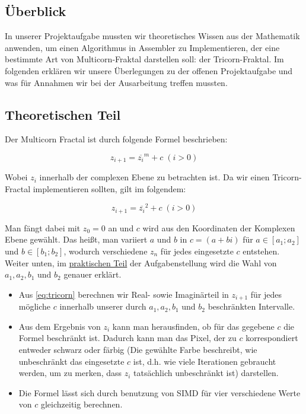 \documentclass[course=erap]{aspdoc}
\begin{document}
\subsection{\"Uberblick}
In unserer Projektaufgabe mussten wir theoretisches Wissen aus der Mathematik anwenden, um einen Algorithmus in Assembler zu Implementieren, der eine bestimmte Art von Multicorn-Fraktal darstellen soll: der Tricorn-Fraktal. Im folgenden erkl\"aren wir unsere \"Uberlegungen zu der offenen Projektaufgabe und was f\"ur Annahmen wir bei der Ausarbeitung treffen mussten. 

\subsection{Theoretischen Teil}

Der Multicorn Fractal ist durch folgende Formel beschrieben:

\begin{equation}\label{eq:multicorn}
    z_{i+1} = \overline{z_i}^m + c \; (i > 0)
\end{equation}

Wobei $z_i$ innerhalb der complexen Ebene zu betrachten ist. Da wir einen Tricorn-Fractal implementieren sollten, gilt im folgendem:

\begin{equation}\label{eq:tricorn}
    z_{i+1} = \overline{z_i}^2 + c \; (i > 0)
\end{equation}

Man f\"angt dabei mit $z_0 = 0$ an und $c$ wird aus den Koordinaten der Komplexen Ebene gew\"ahlt. Das hei{\ss}t, man variiert $a$ und $b$ in $c = (a + bi)$ f\"ur $a \in [a_1;a_2]$ und $b \in [b_1;b_2]$, wodurch verschiedene $z_n$ f\"ur jedes eingesetzte $c$ entstehen. Weiter unten, im \hyperref[problemstellung:praktisch]{praktischen Teil} der Aufgabenstellung wird die Wahl von $a_1, a_2, b_1$ und $b_2$ genauer erkl\"art. 

\begin{itemize}
    \item Aus \eqref{eq:tricorn} berechnen wir Real- sowie Imagin\"arteil in $z_{i+1}$ f\"ur jedes m\"ogliche $c$ innerhalb unserer durch $a_1, a_2, b_1$ und $b_2$ beschr\"ankten Intervalle.  
    \item Aus dem Ergebnis von $z_i$ kann man herausfinden, ob f\"ur das gegebene $c$ die Formel beschr\"ankt ist. Dadurch kann man das Pixel, der zu $c$ korrespondiert entweder schwarz oder f\"arbig (Die gew\"ahlte Farbe beschreibt, wie unbeschr\"ankt das eingesetzte $c$ ist, d.h. wie viele Iterationen gebraucht werden, um zu merken, dass $z_i$ tats\"achlich unbeschr\"ankt ist) darstellen. 
    \item Die Formel l\"asst sich durch benutzung von SIMD f\"ur vier verschiedene Werte von $c$ gleichzeitig berechnen. 
\end{itemize}
\end{document}
